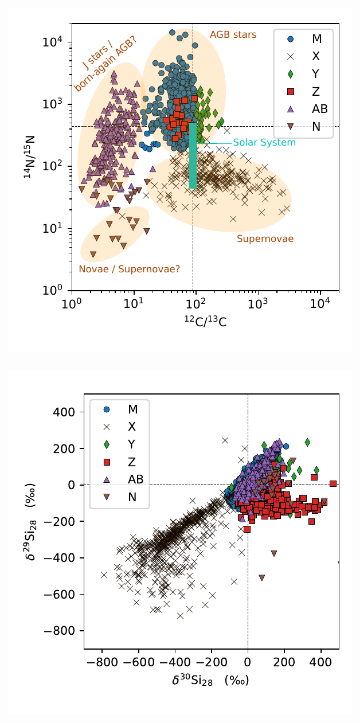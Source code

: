 \documentclass{brandeis-thesis3.2}
\begin{document}
\begin{figure}[H]
     \centering
     \begin{subfigure}[b]{0.48\textwidth}
         \centering
         \includegraphics[width=\textwidth]{figs/sic_n_c_all.pdf}
     \end{subfigure}
     \begin{subfigure}[b]{0.48\textwidth}
         \centering
         \includegraphics[width=\textwidth]{figs/sic_si_3iso_all.pdf}

\end{subfigure}
\end{figure}
\end{document}
